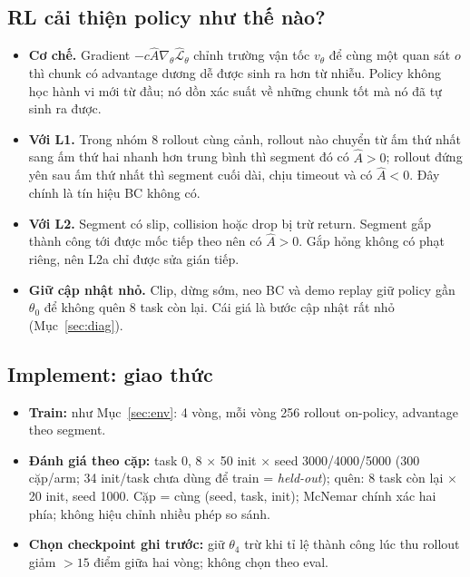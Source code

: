 \documentclass[10pt,a4paper]{article}
\newcommand{\Lhat}{\hat{\mathcal{L}}}
\begin{document}
\subsection{RL cải thiện policy như thế nào?}\label{sec:how}
\begin{itemize}
\item \textbf{Cơ chế.} Gradient $-c\hat A\nabla_\theta\Lhat_\theta$ chỉnh trường vận tốc $v_\theta$ để cùng một
quan sát $o$ thì chunk có advantage dương dễ được sinh ra hơn từ nhiễu. Policy không học hành vi mới từ đầu; nó dồn xác
suất về những chunk tốt mà nó đã tự sinh ra được.
\item \textbf{Với L1.} Trong nhóm 8 rollout cùng cảnh, rollout nào chuyển từ ấm thứ nhất sang ấm thứ hai nhanh hơn
trung bình thì segment đó có $\hat A>0$; rollout đứng yên sau ấm thứ nhất thì segment cuối dài, chịu timeout và có
$\hat A<0$. Đây chính là tín hiệu BC không có.
\item \textbf{Với L2.} Segment có slip, collision hoặc drop bị trừ return. Segment gắp thành công tới được mốc tiếp
theo nên có $\hat A>0$. Gắp hỏng không có phạt riêng, nên L2a chỉ được sửa gián tiếp.
\item \textbf{Giữ cập nhật nhỏ.} Clip, dừng sớm, neo BC và demo replay giữ policy gần $\theta_0$ để không quên 8 task
còn lại. Cái giá là bước cập nhật rất nhỏ (Mục~\ref{sec:diag}).
\end{itemize}

\subsection{Implement: giao thức}
\begin{itemize}
\item \textbf{Train:} như Mục~\ref{sec:env}: 4 vòng, mỗi vòng 256 rollout on-policy, advantage theo segment.
\item \textbf{Đánh giá theo cặp:} task 0, 8 $\times$ 50 init $\times$ seed 3000/4000/5000 (300 cặp/arm; 34 init/task chưa
dùng để train = \emph{held-out}); quên: 8 task còn lại $\times$ 20 init, seed 1000. Cặp = cùng (seed, task, init);
McNemar chính xác hai phía; không hiệu chỉnh nhiều phép so sánh.
\item \textbf{Chọn checkpoint ghi trước:} giữ $\theta_4$ trừ khi tỉ lệ thành công lúc thu rollout giảm $>15$ điểm giữa
hai vòng; không chọn theo eval.
\end{itemize}
\end{document}
